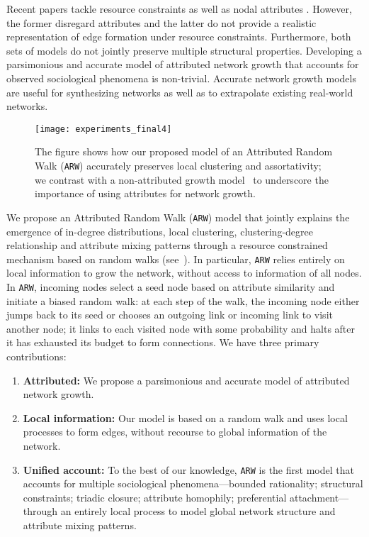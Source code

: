 Recent papers tackle resource constraints \cite{mossa2002truncation,zeng2005construction,wang2009local} as well as nodal attributes
\cite{de2013scale,gong2012evolution}. However, the former disregard attributes and the latter do not provide a realistic representation
of edge formation under resource constraints. Furthermore, both sets of models do not jointly preserve multiple structural properties.
Developing a parsimonious and accurate model of attributed network growth that accounts for observed
sociological phenomena is non-trivial. Accurate network growth models are useful
for synthesizing networks as well as to extrapolate existing real-world networks.




\begin{figure}[t]
	\centering
	\texttt{[image: experiments\_final4]}
	\caption{The figure shows how our proposed model of an Attributed Random Walk (\texttt{ARW}) accurately preserves local clustering and assortativity; we contrast with a non-attributed growth model~\cite{holme2002growing} to underscore the importance of using attributes for network growth.}
	\label{fig:intro_plot}
\end{figure}


We propose an Attributed Random Walk (\texttt{ARW}) model that jointly explains
the emergence of in-degree distributions, local clustering, clustering-degree
relationship and attribute mixing patterns through a resource constrained mechanism based on random walks (see~). In particular, \texttt{ARW} relies entirely on local information to grow the network, without access to information of all nodes. In \texttt{ARW}, incoming nodes select a seed node based on attribute similarity and initiate a biased random walk: at each step of the walk, the incoming node either jumps back to its seed or chooses an outgoing link or incoming link to visit another node; it links to each visited node with some probability and halts after it has exhausted its budget to form connections. We have three primary contributions:
\begin{enumerate}
\item \textbf{Attributed:} We propose a parsimonious and accurate model of attributed network growth.
\item \textbf{Local information:} Our model is based on a random walk and uses local processes to form edges, without recourse to global information of the network.
\item \textbf{Unified account:} To the best of our knowledge, \texttt{ARW} is the first model that accounts for multiple sociological phenomena---bounded rationality; structural constraints; triadic closure; attribute homophily; preferential attachment---through an entirely local process to model global network structure and attribute mixing patterns.
\end{enumerate}



